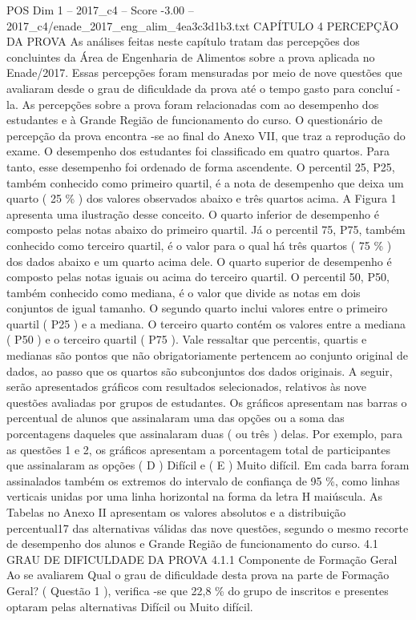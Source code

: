 \begin{textsample}{POS Dim 1 – 2017\_c4 – Score -3.00 – 2017\_c4/enade\_2017\_eng\_alim\_4ea3c3d1b3.txt}  \label{ex:f1_pos_279}
CAPÍTULO 4 PERCEPÇÃO DA PROVA As análises feitas neste capítulo tratam das percepções dos concluintes da Área de Engenharia de Alimentos sobre a prova aplicada no Enade/2017.
Essas percepções foram mensuradas por meio de nove questões que avaliaram desde o grau de dificuldade da prova até o tempo gasto para concluí -la.
As percepções sobre a prova foram relacionadas com ao desempenho dos estudantes e à Grande Região de funcionamento do curso.
O questionário de percepção da prova encontra -se ao final do Anexo VII, que traz a reprodução do exame.
O desempenho dos estudantes foi classificado em quatro quartos.
Para tanto, esse desempenho foi ordenado de forma ascendente.
O percentil 25, P25, também conhecido como primeiro quartil, é a nota de desempenho que deixa um quarto ( 25 \% ) dos valores observados abaixo e três quartos acima.
A Figura 1 apresenta uma ilustração desse conceito.
O quarto inferior de desempenho é composto pelas notas abaixo do primeiro quartil.
Já o percentil 75, P75, também conhecido como terceiro quartil, é o valor para o qual há três quartos ( 75 \% ) dos dados abaixo e um quarto acima dele.
O quarto superior de desempenho é composto pelas notas iguais ou acima do terceiro quartil.
O percentil 50, P50, também conhecido como mediana, é o valor que divide as notas em dois conjuntos de igual tamanho.
O segundo quarto inclui valores entre o primeiro quartil ( P25 ) e a mediana.
O terceiro quarto contém os valores entre a mediana ( P50 ) e o terceiro quartil ( P75 ).
Vale ressaltar que percentis, quartis e medianas são pontos que não obrigatoriamente pertencem ao conjunto original de dados, ao passo que os quartos são subconjuntos dos dados originais.
A seguir, serão apresentados gráficos com resultados selecionados, relativos às nove questões avaliadas por grupos de estudantes.
Os gráficos apresentam nas barras o percentual de alunos que assinalaram uma das opções ou a soma das porcentagens daqueles que assinalaram duas ( ou três ) delas.
Por exemplo, para as questões 1 e 2, os gráficos apresentam a porcentagem total de participantes que assinalaram as opções ( D ) Difícil e ( E ) Muito difícil.
Em cada barra foram assinalados também os extremos do intervalo de confiança de 95 \%, como linhas verticais unidas por uma linha horizontal na forma da letra H maiúscula.
As Tabelas no Anexo II apresentam os valores absolutos e a distribuição percentual17 das alternativas válidas das nove questões, segundo o mesmo recorte de desempenho dos alunos e Grande Região de funcionamento do curso. 4.1 GRAU DE DIFICULDADE DA PROVA 4.1.1 Componente de Formação Geral Ao se avaliarem Qual o grau de dificuldade desta prova na parte de Formação Geral? ( Questão 1 ), verifica -se que 22,8 \% do grupo de inscritos e presentes optaram pelas alternativas Difícil ou Muito difícil.

\end{textsample}
